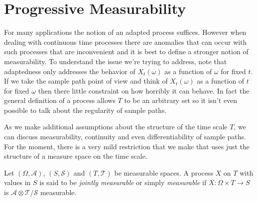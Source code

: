 \section{Progressive Measurability}
For many applications the notion of an adapted process
suffices.  However when dealing with continuous time processes there
are anomalies that can occur with such processes that are inconvenient
and it is best to define a stronger notion of measurability.  To
understand the issue we're trying to address, note that adaptedness only addresses the behavior of
$X_t(\omega)$ as a function of $\omega$ for fixed $t$.  If we take the
sample path point of view and think of $X_t(\omega)$ as a function of
$t$ for fixed $\omega$ then there little constraint on how horribly it
can behave.  In fact the general definition of a process allows $T$ to
be an arbitrary set so it isn't even possible to talk about the
regularity of sample paths.  

As we make additional assumptions about the structure of the time
scale $T$, we can discuss
measurability, continuity and even differentiability of sample paths.
For the moment, there is a
very mild restriction that we make that uses just the structure of  a
measure space on the time scale.

\begin{defn}Let $(\Omega, \mathcal{A})$, $(S, \mathcal{S})$  and
  $(T, \mathcal{T})$  be measurable spaces.  A process $X$ on $T$ with
  values in $S$ is said to be \emph{jointly
    measurable} or simply \emph{measurable} if $X : \Omega \times T
  \to S$ is $\mathcal{A} \otimes \mathcal{T}/\mathcal{S}$ measurable.
\end{defn}

